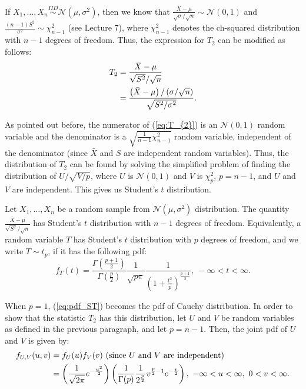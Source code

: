 \documentclass[a4paper,english,12pt]{article}
\begin{document}
If $ X_{1},\ldots,X_{n}\stackrel{IID}{\sim} \mathcal{N}(\mu,\sigma^{2}) $, then we know that $ \frac{\bar{X}-\mu}{\sqrt{\sigma}/\sqrt{n}}\sim \mathcal{N}(0,1) $ and $ \frac{(n-1)S^{2}}{\sigma^{2}} \sim \chi_{n-1}^{2} $ (see Lecture $ 7 $), where $ \chi_{n-1}^{2} $ denotes the ch-squared distribution with $ n-1 $ degrees of freedom. Thus, the expression for $ T_{2} $ can be modified as follows:
\begin{align}
T_{2}&=\frac{\bar{X}-\mu}{\sqrt{S^{2}}/\sqrt{n}}\nonumber\\
     &=\frac{\left(\bar{X}-\mu\right)/\left(\sigma/\sqrt{n}\right)}{\sqrt{S^{2}/\sigma^2}}.\label{eq:T_{2}}
\end{align}

As pointed out before, the numerator of  (\ref*{eq:T_{2}}) is an $ \mathcal{N}(0,1) $ random variable and the denominator is a $ \sqrt{\frac{1}{n-1}\chi_{n-1}^{2}} $ random variable, independent of the denominator (since $ \bar{X} $ and $ S $ are independent random variables). Thus, the distribution of $ T_{2} $ can be found by solving the simplified problem of finding the distribution of $ U/\sqrt{V/p} $, where $ U $ is $ \mathcal{N}(0,1) $ and $ V $ is $ \chi_{p}^{2} $, $ p=n-1 $, and $ U $ and $ V $ are independent. This gives us Student's $ t $ distribution.
\\

\begin{defn}
	Let $ X_{1},\ldots,X_{n} $ be a random sample from $ \mathcal{N}(\mu,\sigma^{2}) $ distribution. The quantity $ \frac{\bar{X}-\mu}{\sqrt{S^{2}}/\sqrt{n}} $ has Student's $ t $ distribution with $ n-1 $ degrees of freedom. Equivalently, a random variable $ T $ has Student's $ t $ distribution with $ p $ degrees of freedom, and we write $ T\sim t_{p} $, if it has the following pdf:
	\begin{equation}
	f_{T}(t)=\frac{\Gamma\left(\frac{p+1}{2}\right)}{\Gamma\left(\frac{p}{2}\right)} \frac{1}{\sqrt{p\pi}} \frac{1}{\left(1+\frac{t^{2}}{p}\right)^{\frac{p+1}{2}}},~-\infty < t < \infty.\label{eq:pdf_ST}
	\end{equation}
\end{defn}
When $ p=1 $, (\ref*{eq:pdf_ST}) becomes the pdf of Cauchy distribution. In order to show that the statistic $ T_{2} $ has this distribution, 
let $ U $ and $ V $ be random variables as defined in the previous paragraph, and let $ p=n-1 $. Then, the joint pdf of $ U $ and $ V $ is given by:
\begin{align}
f_{U,V}(u,v)&=f_{U}(u)f_{V}(v)~(\text{since}~U~\text{and}~V~\text{are independent})\nonumber\\
            &=\left(\frac{1}{\sqrt{2\pi}} e^{-\frac{u^{2}}{2}}\right)\left(\frac{1}{\Gamma(p)} \frac{1}{2^{\frac{p}{2}}} v^{\frac{p}{2}-1} e^{-\frac{v}{2}}\right),~-\infty < u < \infty,~0<v<\infty.\label{eq:f_{U,V}(u,v)}
\end{align}
\end{document}
